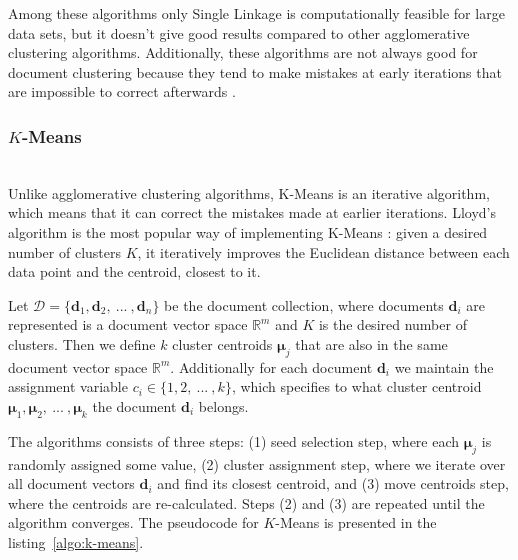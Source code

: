 Among these algorithms only Single Linkage is computationally feasible
for large data sets, but it doesn't give good results compared to other
agglomerative clustering algorithms. Additionally, these algorithms
are not always good for document clustering because they tend to
make mistakes at early iterations that are impossible to correct
afterwards \cite{steinbach2000comparison}.



\subsubsection{$K$-Means} \label{sec:kmeans} \ \\

Unlike agglomerative clustering algorithms, K-Means is an iterative
algorithm, which means that it can correct the mistakes made
at earlier iterations. Lloyd's algorithm is the most popular way
of implementing K-Means \cite{xu2005survey}: given a desired number of clusters $K$,
it iteratively improves the Euclidean distance between each data
point and the centroid, closest to it.


Let $\mathcal D = \{  \mathbf d_1, \mathbf d_2, \ ... \ , \mathbf d_n \}$
be the document collection, where documents $\mathbf d_i$ are represented
is a document vector space $\mathbb R^m$ and $K$ is the desired
number of clusters. Then we define $k$ cluster centroids $\boldsymbol \mu_j$ that are
also in the same document vector space $\mathbb R^m$.
Additionally for each document $\mathbf d_i$ we maintain the assignment
variable $c_i \in \{ 1, 2, \ ... \ , k \}$, which specifies to what
cluster centroid $\boldsymbol \mu_1, \boldsymbol \mu_2, \ ... \ , \boldsymbol \mu_k$
the document $\mathbf d_i$ belongs.


The algorithms consists of three steps: (1) seed selection step,
where each $\boldsymbol \mu_j$ is randomly assigned some value,
(2) cluster assignment step, where we iterate over all document vectors
$\mathbf d_i$ and find its closest centroid, and (3)  move centroids step,
where the centroids are re-calculated. Steps (2) and (3) are repeated
until the algorithm converges. The pseudocode for $K$-Means is presented
in the listing~\ref{algo:k-means}.

